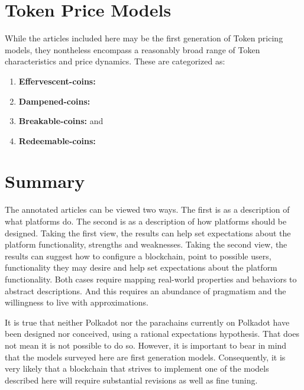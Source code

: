 \documentclass[11pt]{article}
\begin{document}
\section{Token Price Models}

While the articles included here may be the first generation of Token pricing models, they nontheless encompass a reasonably broad range of Token characteristics and price dynamics. These are categorized as:

\begin{enumerate}
    \item \textbf{Effervescent-coins:} 
    \item \textbf{Dampened-coins:} 
    \item \textbf{Breakable-coins:}  and 
    \item \textbf{Redeemable-coins:} 
\end{enumerate}

\section{Summary}

The annotated articles can be viewed two ways. The first is as a description of what platforms do. The second is as a description of how platforms should be designed. Taking the first view, the results can help set expectations about the platform functionality, strengths and weaknesses. Taking the second view, the results can suggest how to configure a blockchain, point to possible users, functionality they may desire and help set expectations about the platform functionality. Both cases require mapping real-world properties and behaviors to abstract descriptions. And this requires an abundance of pragmatism and the willingness to live with approximations.

It is true that neither Polkadot nor the parachains currently on Polkadot have been designed nor conceived, using a rational expectations hypothesis.  That does not mean it is not possible to do so.  However, it is important to bear in mind that the models surveyed here are first generation models. Consequently, it is very likely that a blockchain that strives to implement one of the models described here will require substantial revisions as well as fine tuning.

\clearpage
\begin{refsection}
\nocite{long20,cong21,cong22,sockin23a,sockin23b,rogoff22}
\printbibliography[heading=bibnumbered]
\end{refsection}
\end{document}
